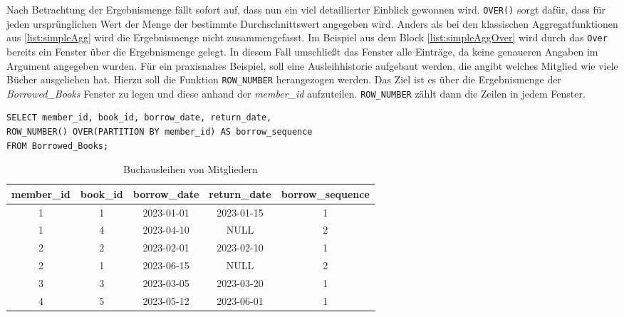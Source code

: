 Nach Betrachtung der Ergebnismenge fällt sofort auf, dass nun ein viel
detaillierter Einblick gewonnen wird. \texttt{OVER()} sorgt dafür, dass für jeden
ursprünglichen Wert der Menge der bestimmte Durchschnittswert angegeben wird.
Anders als bei den klassischen Aggregatfunktionen aus \ref{list:simpleAgg} wird
die Ergebnismenge nicht zusammengefasst. Im Beispiel aus dem Block \ref{list:simpleAggOver}
wird durch das \texttt{Over} bereits ein Fenster über die Ergebnismenge gelegt. In
diesem Fall umschließt das Fenster alle Einträge, da keine genaueren Angaben im
Argument angegeben wurden. Für ein praxisnahes Beispiel, soll eine
Ausleihhistorie aufgebaut werden, die angibt welches Mitglied wie viele Bücher ausgeliehen
hat. Hierzu soll die Funktion \texttt{ROW\_NUMBER} herangezogen werden. Das Ziel
ist es über die Ergebnismenge der \textit{Borrowed\_Books} Fenster zu legen und diese
anhand der \textit{member\_id} aufzuteilen. \texttt{ROW\_NUMBER} zählt dann die
Zeilen in jedem Fenster.

\begin{lstlisting}
SELECT member_id, book_id, borrow_date, return_date,
ROW_NUMBER() OVER(PARTITION BY member_id) AS borrow_sequence
FROM Borrowed_Books;
\end{lstlisting}
\begin{table}[h]
	\centering
	\begin{tabular}{|c|c|c|c|c|}
		\hline
		\textbf{member\_id} & \textbf{book\_id} & \textbf{borrow\_date} & \textbf{return\_date} & \textbf{borrow\_sequence} \\
		\hline
		1                   & 1                 & 2023-01-01            & 2023-01-15            & 1                         \\
		\hline
		1                   & 4                 & 2023-04-10            & NULL                  & 2                         \\
		\hline
		2                   & 2                 & 2023-02-01            & 2023-02-10            & 1                         \\
		\hline
		2                   & 1                 & 2023-06-15            & NULL                  & 2                         \\
		\hline
		3                   & 3                 & 2023-03-05            & 2023-03-20            & 1                         \\
		\hline
		4                   & 5                 & 2023-05-12            & 2023-06-01            & 1                         \\
		\hline
	\end{tabular}
	\caption{Buchausleihen von Mitgliedern}
	\label{tab:member_borrows}
\end{table}

